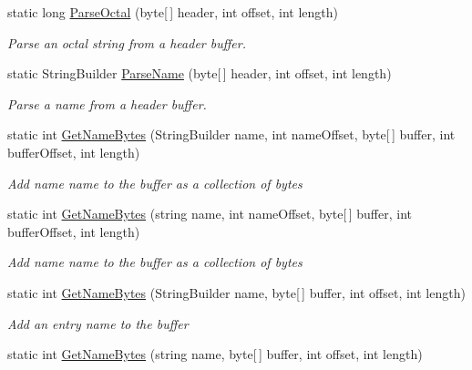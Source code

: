 \begin{DoxyCompactItemize}
\item 
static long \hyperlink{class_i_c_sharp_code_1_1_sharp_zip_lib_1_1_tar_1_1_tar_header_afadab1a71833c61166b76803d9132590}{Parse\+Octal} (byte\mbox{[}$\,$\mbox{]} header, int offset, int length)
\begin{DoxyCompactList}\small\item\em Parse an octal string from a header buffer. \end{DoxyCompactList}\item 
static String\+Builder \hyperlink{class_i_c_sharp_code_1_1_sharp_zip_lib_1_1_tar_1_1_tar_header_a6d0743fbe47cd3a811fa85d70a04e00d}{Parse\+Name} (byte\mbox{[}$\,$\mbox{]} header, int offset, int length)
\begin{DoxyCompactList}\small\item\em Parse a name from a header buffer. \end{DoxyCompactList}\item 
static int \hyperlink{class_i_c_sharp_code_1_1_sharp_zip_lib_1_1_tar_1_1_tar_header_a54ba5bf152ca9f6fc43706fa71d30ba0}{Get\+Name\+Bytes} (String\+Builder name, int name\+Offset, byte\mbox{[}$\,$\mbox{]} buffer, int buffer\+Offset, int length)
\begin{DoxyCompactList}\small\item\em Add {\itshape name} name to the buffer as a collection of bytes \end{DoxyCompactList}\item 
static int \hyperlink{class_i_c_sharp_code_1_1_sharp_zip_lib_1_1_tar_1_1_tar_header_a5836221c71f96a30bec65d142be258df}{Get\+Name\+Bytes} (string name, int name\+Offset, byte\mbox{[}$\,$\mbox{]} buffer, int buffer\+Offset, int length)
\begin{DoxyCompactList}\small\item\em Add {\itshape name} name to the buffer as a collection of bytes \end{DoxyCompactList}\item 
static int \hyperlink{class_i_c_sharp_code_1_1_sharp_zip_lib_1_1_tar_1_1_tar_header_a5bafcfe38496098671218de5d37a3a41}{Get\+Name\+Bytes} (String\+Builder name, byte\mbox{[}$\,$\mbox{]} buffer, int offset, int length)
\begin{DoxyCompactList}\small\item\em Add an entry name to the buffer \end{DoxyCompactList}\item 
static int \hyperlink{class_i_c_sharp_code_1_1_sharp_zip_lib_1_1_tar_1_1_tar_header_a077e59e361869688a587e9e394b8a661}{Get\+Name\+Bytes} (string name, byte\mbox{[}$\,$\mbox{]} buffer, int offset, int length)

\end{DoxyCompactItemize}
